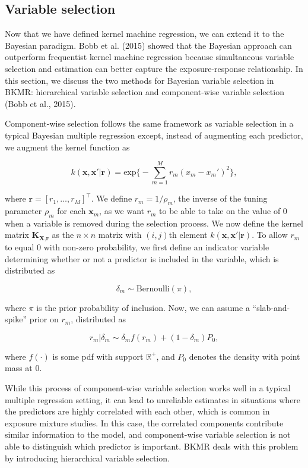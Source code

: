\documentclass[12pt, twoside]{amherstthesis}
\begin{document}
\hypertarget{variable-selection}{%
\subsection{Variable selection}\label{variable-selection}}

Now that we have defined kernel machine regression, we can extend it to the Bayesian paradigm. Bobb et al. (2015) showed that the Bayesian approach can outperform frequentist kernel machine regression because simultaneous variable selection and estimation can better capture the exposure-response relationship. In this section, we discuss the two methods for Bayesian variable selection in BKMR: hierarchical variable selection and component-wise variable selection (Bobb et al., 2015).

Component-wise selection follows the same framework as variable selection in a typical Bayesian multiple regression except, instead of augmenting each predictor, we augment the kernel function as

\[
k(\textbf{x}, \textbf{x}'|\textbf{r}) = \text{exp}\bigg\{ -\sum_{m=1}^Mr_m(x_m-x_m')^2 \bigg\},
\]

\noindent where \(\textbf{r}=[r_1,\dots,r_M]^\top\). We define \(r_m=1/{\rho_m}\), the inverse of the tuning parameter \(\rho_m\) for each \(\textbf{x}_m\), as we want \(r_m\) to be able to take on the value of \(0\) when a variable is removed during the selection process. We now define the kernel matrix \(\textbf{K}_{\textbf{X},\textbf{r}}\) as the \(n\times n\) matrix with \((i,j)\)th element \(k(\textbf{x}, \textbf{x}'|\textbf{r})\). To allow \(r_m\) to equal 0 with non-zero probability, we first define an indicator variable determining whether or not a predictor is included in the variable, which is distributed as

\[
\delta_m \sim \text{Bernoulli}(\pi),
\]

\noindent where \(\pi\) is the prior probability of inclusion. Now, we can assume a ``slab-and-spike'' prior on \(r_m\), distributed as

\[
r_m|\delta_m \sim \delta_mf(r_m) + (1-\delta_m)P_0,
\]

\noindent where \(f(\cdot)\) is some pdf with support \(\mathbb{R}^+\), and \(P_0\) denotes the density with point mass at 0.

While this process of component-wise variable selection works well in a typical multiple regression setting, it can lead to unreliable estimates in situations where the predictors are highly correlated with each other, which is common in exposure mixture studies. In this case, the correlated components contribute similar information to the model, and component-wise variable selection is not able to distinguish which predictor is important. BKMR deals with this problem by introducing hierarchical variable selection.
\end{document}

